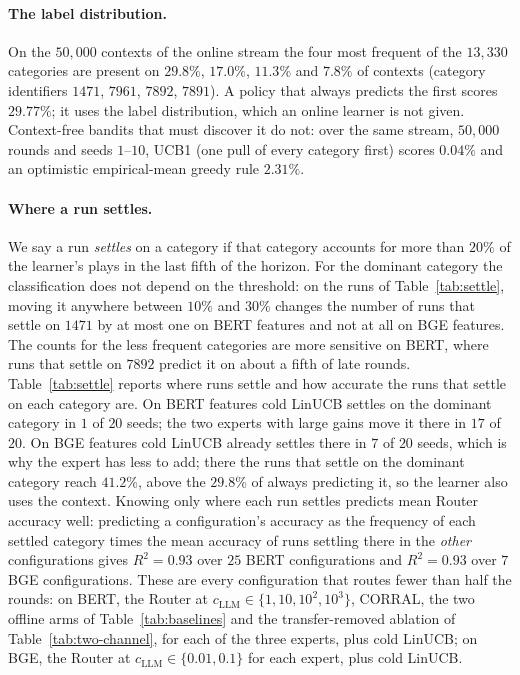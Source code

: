 \documentclass[anon]{alt2027} %
\begin{document}
\paragraph{The label distribution.}
On the $50{,}000$ contexts of the online stream the four most frequent of the
$13{,}330$ categories are present on $29.8\%$, $17.0\%$, $11.3\%$ and $7.8\%$
of contexts (category identifiers $1471$, $7961$, $7892$, $7891$). A policy
that always predicts the first scores $29.77\%$; it uses the label
distribution, which an online learner is not given. Context-free bandits that
must discover it do not: over the same stream, $50{,}000$ rounds and seeds
$1$--$10$, UCB1 (one pull of every category first) scores $0.04\%$ and an
optimistic empirical-mean greedy rule $2.31\%$.

\paragraph{Where a run settles.}
We say a run \emph{settles} on a category if that category accounts for more
than $20\%$ of the learner's plays in the last fifth of the horizon. For the
dominant category the classification does not depend on the threshold: on the
runs of Table~\ref{tab:settle}, moving it anywhere between $10\%$ and $30\%$
changes the number of runs that settle on $1471$ by at most one on BERT
features and not at all on BGE features. The counts for the less frequent
categories are more sensitive on BERT, where runs that settle on $7892$
predict it on about a fifth of late rounds. Table~\ref{tab:settle}
reports where runs settle and how accurate the runs that settle on each
category are. On BERT features cold LinUCB settles on the dominant category
in $1$ of $20$ seeds; the two experts with large gains move it there in $17$ of
$20$. On BGE features cold LinUCB already settles there in $7$ of $20$ seeds,
which is why the expert has less to add; there the runs that settle on the
dominant category reach $41.2\%$, above the $29.8\%$ of always predicting
it, so the learner also uses the context. Knowing only where each run
settles predicts mean Router accuracy well: predicting a configuration's
accuracy as the frequency of each settled category times the mean accuracy
of runs settling there in the \emph{other} configurations gives $R^2=0.93$
over $25$ BERT configurations and $R^2=0.93$ over $7$ BGE configurations.
These are every configuration that routes fewer than half the rounds: on
BERT, the Router at $c_{\mathrm{LLM}}\in\{1,10,10^2,10^3\}$, CORRAL, the two offline arms of
Table~\ref{tab:baselines} and the transfer-removed ablation of
Table~\ref{tab:two-channel}, for each of the three experts, plus cold
LinUCB; on BGE, the Router at $c_{\mathrm{LLM}}\in\{0.01,0.1\}$ for each expert, plus cold
LinUCB.
\end{document}
